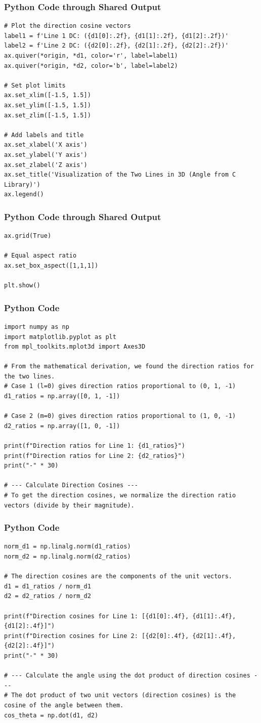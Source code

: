 \documentclass{beamer}
\begin{document}
\begin{frame}[fragile]
\frametitle{Python Code through Shared Output}
\begin{lstlisting}
# Plot the direction cosine vectors
label1 = f'Line 1 DC: ({d1[0]:.2f}, {d1[1]:.2f}, {d1[2]:.2f})'
label2 = f'Line 2 DC: ({d2[0]:.2f}, {d2[1]:.2f}, {d2[2]:.2f})'
ax.quiver(*origin, *d1, color='r', label=label1)
ax.quiver(*origin, *d2, color='b', label=label2)

# Set plot limits
ax.set_xlim([-1.5, 1.5])
ax.set_ylim([-1.5, 1.5])
ax.set_zlim([-1.5, 1.5])

# Add labels and title
ax.set_xlabel('X axis')
ax.set_ylabel('Y axis')
ax.set_zlabel('Z axis')
ax.set_title('Visualization of the Two Lines in 3D (Angle from C Library)')
ax.legend()
\end{lstlisting}
\end{frame}  
\begin{frame}[fragile]
\frametitle{Python Code through Shared Output}
\begin{lstlisting}
ax.grid(True)

# Equal aspect ratio
ax.set_box_aspect([1,1,1])

plt.show()
\end{lstlisting}
\end{frame}  
\begin{frame}[fragile]
\frametitle{Python Code }
\begin{lstlisting}
import numpy as np
import matplotlib.pyplot as plt
from mpl_toolkits.mplot3d import Axes3D

# From the mathematical derivation, we found the direction ratios for the two lines.
# Case 1 (l=0) gives direction ratios proportional to (0, 1, -1)
d1_ratios = np.array([0, 1, -1])

# Case 2 (m=0) gives direction ratios proportional to (1, 0, -1)
d2_ratios = np.array([1, 0, -1])

print(f"Direction ratios for Line 1: {d1_ratios}")
print(f"Direction ratios for Line 2: {d2_ratios}")
print("-" * 30)

# --- Calculate Direction Cosines ---
# To get the direction cosines, we normalize the direction ratio vectors (divide by their magnitude).
\end{lstlisting}
\end{frame}  
\begin{frame}[fragile]
\frametitle{Python Code }
\begin{lstlisting}
norm_d1 = np.linalg.norm(d1_ratios)
norm_d2 = np.linalg.norm(d2_ratios)

# The direction cosines are the components of the unit vectors.
d1 = d1_ratios / norm_d1
d2 = d2_ratios / norm_d2

print(f"Direction cosines for Line 1: [{d1[0]:.4f}, {d1[1]:.4f}, {d1[2]:.4f}]")
print(f"Direction cosines for Line 2: [{d2[0]:.4f}, {d2[1]:.4f}, {d2[2]:.4f}]")
print("-" * 30)

# --- Calculate the angle using the dot product of direction cosines ---
# The dot product of two unit vectors (direction cosines) is the cosine of the angle between them.
cos_theta = np.dot(d1, d2)
\end{lstlisting}
\end{frame}  
\end{document}
